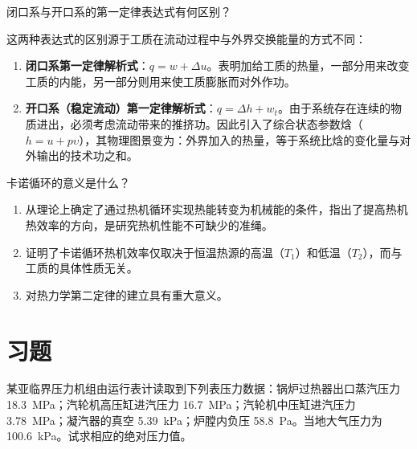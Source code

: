 \begin{problem}
闭口系与开口系的第一定律表达式有何区别？
\end{problem}

\begin{solution}
这两种表达式的区别源于工质在流动过程中与外界交换能量的方式不同：

\begin{enumerate}
  \item \textbf{闭口系第一定律解析式}：\(q=w+\Delta u\)。表明加给工质的热量，一部分用来改变工质的内能，另一部分则用来使工质膨胀而对外作功。
  \item \textbf{开口系（稳定流动）第一定律解析式}：\(q=\Delta h+w_{t}\)。由于系统存在连续的物质进出，必须考虑流动带来的推挤功。因此引入了综合状态参数焓（\(h=u+p\upsilon\)），其物理图景变为：外界加入的热量，等于系统比焓的变化量与对外输出的技术功之和。
\end{enumerate}
\end{solution}

\begin{problem}
卡诺循环的意义是什么？
\end{problem}

\begin{solution}
\begin{enumerate}
  \item 从理论上确定了通过热机循环实现热能转变为机械能的条件，指出了提高热机热效率的方向，是研究热机性能不可缺少的准绳。
  \item 证明了卡诺循环热机效率仅取决于恒温热源的高温（\(T_{1}\)）和低温（\(T_{2}\)），而与工质的具体性质无关。
  \item 对热力学第二定律的建立具有重大意义。
\end{enumerate}
\end{solution}

\section{习题}

\begin{problem}[绝对压强的计算]
某亚临界压力机组由运行表计读取到下列表压力数据：锅炉过热器出口蒸汽压力 \qty{18.3}{MPa}；汽轮机高压缸进汽压力 \qty{16.7}{MPa}；汽轮机中压缸进汽压力 \qty{3.78}{MPa}；凝汽器的真空 \qty{5.39}{kPa}；炉膛内负压 \qty{58.8}{Pa}。当地大气压力为 \qty{100.6}{kPa}。试求相应的绝对压力值。
\end{problem}

